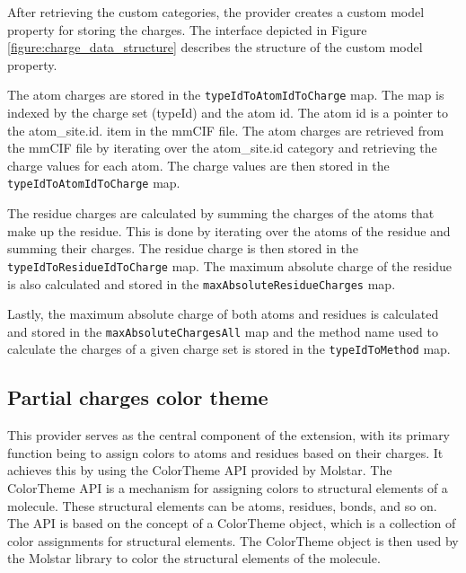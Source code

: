 \documentclass[
  digital,     %
  oneside,     %
  nosansbold,  %
  nocolorbold, %
  lof,         %
  lot,         %
]{fithesis4}
\begin{document}
After retrieving the custom categories, the provider creates a custom model property for storing the charges. The interface depicted in Figure \ref{figure:charge_data_structure} describes the structure of the custom model property.


The atom charges are stored in the \texttt{typeIdToAtomIdToCharge} map. The map is indexed by the charge set (typeId) and the atom id. The atom id is a pointer to the atom\_site.id. item in the mmCIF file. The atom charges are retrieved from the mmCIF file by iterating over the atom\_site.id category and retrieving the charge values for each atom. The charge values are then stored in the \\ \texttt{typeIdToAtomIdToCharge} map.

The residue charges are calculated by summing the charges of the atoms that make up the residue. This is done by iterating over the atoms of the residue and summing their charges. The residue charge is then stored in the \texttt{typeIdToResidueIdToCharge} map. The maximum absolute charge of the residue is also calculated and stored in the \texttt{maxAbsoluteResidueCharges} map.

Lastly, the maximum absolute charge of both atoms and residues is calculated and stored in the \texttt{maxAbsoluteChargesAll} map and the method name used to calculate the charges of a given charge set is stored in the \texttt{typeIdToMethod} map.

\subsection{Partial charges color theme}

This provider serves as the central component of the extension, with its primary function being to assign colors to atoms and residues based on their charges. It achieves this by using the ColorTheme API provided by Molstar. The ColorTheme API is a mechanism for assigning colors to structural elements of a molecule. These structural elements can be atoms, residues, bonds, and so on. The API is based on the concept of a ColorTheme object, which is a collection of color assignments for structural elements. The ColorTheme object is then used by the Molstar library to color the structural elements of the molecule.
\end{document}
